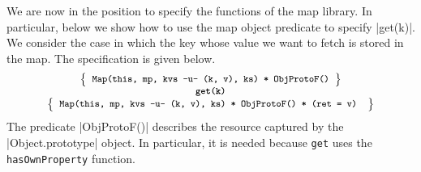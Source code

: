 We are now in the position to specify the functions of the map library. In particular, below we show how to use 
the map object predicate to specify \jsinline|get(k)|.  
%
We consider the case in which the key whose value we  want to fetch is stored in the 
map.  The specification is given below. 
%
\begin{displaymath} 
{\footnotesize
\begin{array}{c}
\left\{ {\begin{array}{c}
 \text{\texttt{Map(this, mp, kvs -u- (k, v), ks) * ObjProtoF()}} \\ 
\end{array}} \right\} \\
%
\text{\bfseries \texttt{get(k)}} \\[0.2mm]
%
\left\{ {\begin{array}{c}
 \text{\texttt{Map(this, mp, kvs -u- (k, v), ks) * ObjProtoF() * (ret = v) }} \\
\end{array}} \right\}
\end{array}
} 
\end{displaymath}
%
The predicate \jsinline|ObjProtoF()| describes the resource captured by the \jsinline|Object.prototype| object. 
In particular, it is needed because \texttt{get} uses the \texttt{hasOwnProperty} function.





